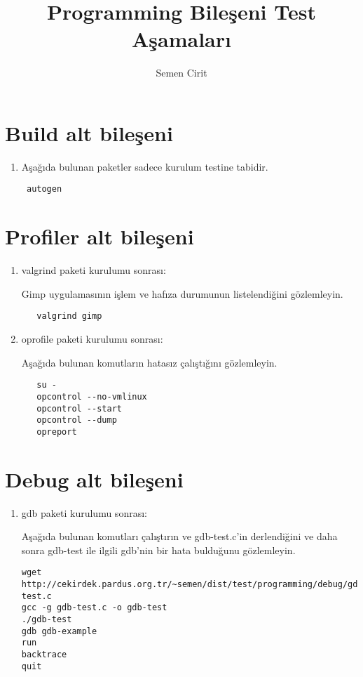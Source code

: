 \documentclass[a4paper,10pt]{article}
\title{Programming Bileşeni Test Aşamaları}
\author{Semen Cirit}
\begin{document}
\maketitle
\section{Build alt bileşeni}
\begin{enumerate}
 \item Aşağıda bulunan paketler sadece kurulum testine tabidir.
\begin{verbatim}
 autogen
\end{verbatim}

\end{enumerate}


\section{Profiler alt bileşeni}
\begin{enumerate}
 \item valgrind paketi kurulumu sonrası:

Gimp uygulamasının işlem ve hafıza durumunun listelendiğini gözlemleyin.

  \begin{verbatim}
   valgrind gimp
  \end{verbatim}


 \item oprofile paketi kurulumu sonrası:

Aşağıda bulunan komutların hatasız çalıştığını gözlemleyin.
  \begin{verbatim}
   su -
   opcontrol --no-vmlinux
   opcontrol --start
   opcontrol --dump
   opreport
  \end{verbatim}

\end{enumerate}

\section{Debug alt bileşeni}
\begin{enumerate}
 \item gdb paketi kurulumu sonrası:

Aşağıda bulunan komutları çalıştırın ve gdb-test.c'in derlendiğini ve daha sonra gdb-test ile ilgili gdb'nin bir hata bulduğunu gözlemleyin.
\begin{verbatim}
wget http://cekirdek.pardus.org.tr/~semen/dist/test/programming/debug/gdb-test.c
gcc -g gdb-test.c -o gdb-test
./gdb-test
gdb gdb-example
run
backtrace
quit
\end{verbatim}


\end{enumerate}
\end{document}
